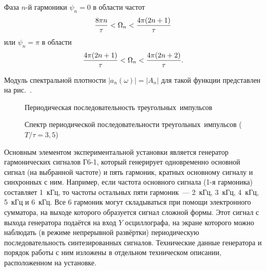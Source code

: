 Фаза $n$-й гармоники $\psi_n=0$ в области частот
\begin{equation}
	\frac{8\pi n}{\tau}<\Omega_n<\frac{4\pi (2n+1)}{\tau}
	\eqmark{6.2.6}
\end{equation}
или $\psi_n=\pi$ в области
\begin{equation}
	\frac{4\pi(2n+1)}{\tau}<\Omega_n<\frac{4\pi(2n+2)}{\tau}.
	\eqmark{6.2.7}
\end{equation}

Модуль спектральной плотности $|a_n(\omega)|=|A_n|$ для такой функции представлен на рис.~.

\begin{figure}[t]
\begin{minipage}{0.45\textwidth}
	\caption{Периодическая последовательность треугольных~импульсов}
\end{minipage}
\hfill
\begin{minipage}{0.45\textwidth}
	\caption{Спектр периодической последовательности треугольных~импульсов ($T/\tau=3,5$)}
\end{minipage}
\end{figure}


\experiment
Основным элементом экспериментальной установки является генератор гармонических сигналов Г6-1, который генерирует
одновременно основной сигнал (на выбранной частоте) и пять гармоник, кратных основному сигналу и синхронных с ним.
Например, если частота основного сигнала (1-я гармоника) составляет 1~кГц, то частоты остальных пяти гармоник~--- 2~кГц,
3~кГц, 4~кГц, 5~кГц и 6~кГц. Все 6 гармоник могут складываться при помощи электронного сумматора, на выходе которого
образуется сигнал сложной формы. Этот сигнал с выхода генератора подаётся на вход $Y$ осциллографа, на экране которого
можно наблюдать (в режиме непрерывной развёртки) периодическую последовательность синтезированных сигналов. Технические
данные генератора и порядок работы с ним изложены в отдельном техническом описании, расположенном на установке.

